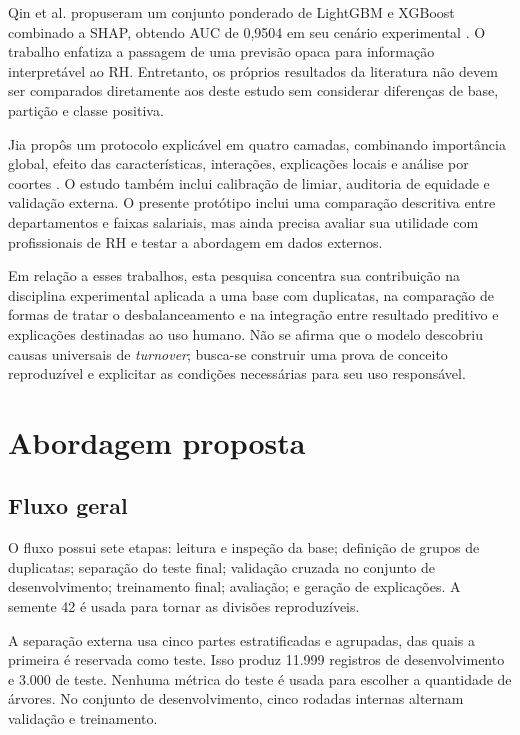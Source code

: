 \documentclass[12pt]{article}
\begin{document}
Qin et al. propuseram um conjunto ponderado de LightGBM e XGBoost combinado a SHAP, obtendo AUC de 0,9504 em seu cenário experimental \cite{qin2026turnover}. O trabalho enfatiza a passagem de uma previsão opaca para informação interpretável ao RH. Entretanto, os próprios resultados da literatura não devem ser comparados diretamente aos deste estudo sem considerar diferenças de base, partição e classe positiva.

Jia propôs um protocolo explicável em quatro camadas, combinando importância global, efeito das características, interações, explicações locais e análise por coortes \cite{jia2026explainable}. O estudo também inclui calibração de limiar, auditoria de equidade e validação externa. O presente protótipo inclui uma comparação descritiva entre departamentos e faixas salariais, mas ainda precisa avaliar sua utilidade com profissionais de RH e testar a abordagem em dados externos.

Em relação a esses trabalhos, esta pesquisa concentra sua contribuição na disciplina experimental aplicada a uma base com duplicatas, na comparação de formas de tratar o desbalanceamento e na integração entre resultado preditivo e explicações destinadas ao uso humano. Não se afirma que o modelo descobriu causas universais de \textit{turnover}; busca-se construir uma prova de conceito reproduzível e explicitar as condições necessárias para seu uso responsável.

\section{Abordagem proposta}
\label{sec:abordagem}

\subsection{Fluxo geral}

O fluxo possui sete etapas: leitura e inspeção da base; definição de grupos de duplicatas; separação do teste final; validação cruzada no conjunto de desenvolvimento; treinamento final; avaliação; e geração de explicações. A semente 42 é usada para tornar as divisões reproduzíveis.

A separação externa usa cinco partes estratificadas e agrupadas, das quais a primeira é reservada como teste. Isso produz 11.999 registros de desenvolvimento e 3.000 de teste. Nenhuma métrica do teste é usada para escolher a quantidade de árvores. No conjunto de desenvolvimento, cinco rodadas internas alternam validação e treinamento.
\end{document}
